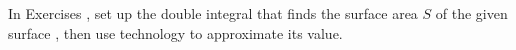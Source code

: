 {\noindent In Exercises}
{, set up the double integral that finds the surface area $S$ of the given surface \surfaceS, then use technology to approximate its value.
}
